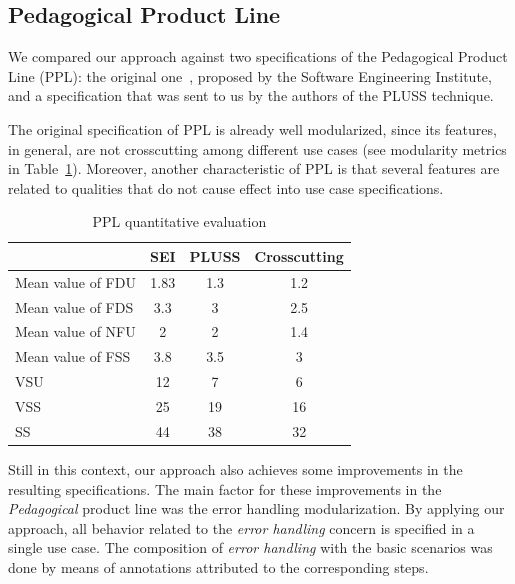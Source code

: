 \documentclass[11pt]{report}
\begin{document}
\subsection{Pedagogical Product Line}

We compared our approach against two specifications of the Pedagogical Product Line (PPL): the original one~\cite{ppl-url}, proposed by the Software Engineering Institute, and a specification that was sent to us by the authors of the PLUSS technique. 

The original specification of PPL is already well modularized, since its features, in general, are not crosscutting among different use cases (see modularity metrics in Table~\ref{tab:ppl-metrics}). Moreover, another characteristic of PPL is that several features are related to qualities that do not cause effect into use case specifications. 

\begin{table}[hb]
\centering
 \caption{PPL quantitative evaluation}
\label{tab:ppl-metrics}
\begin{small}
\begin{tabular}{lccc} \hline
					& SEI 	& PLUSS 	& Crosscutting	\\ \hline
Mean value of FDU 		& 1.83	& 1.3	& 1.2	\\
Mean value of FDS 		& 3.3	& 3		& 2.5	\\
Mean value of NFU 		& 2		& 2		& 1.4	\\
Mean value of FSS 		& 3.8	& 3.5	& 3		\\ 
VSU 					& 12		& 7		& 6		\\
VSS 					& 25		& 19		& 16		\\
SS 					& 44		& 38		& 32		\\	\hline
\end{tabular}
\end{small}
\end{table}

Still in this context, our approach also achieves some improvements in the resulting specifications. The main factor for these improvements in the \emph{Pedagogical} product line was the error handling modularization. By applying our approach, all behavior related to the \emph{error handling} concern is specified in a single use case. The composition of \emph{error handling} with the basic scenarios was done by means of annotations attributed to the corresponding steps. 

\end{document}
